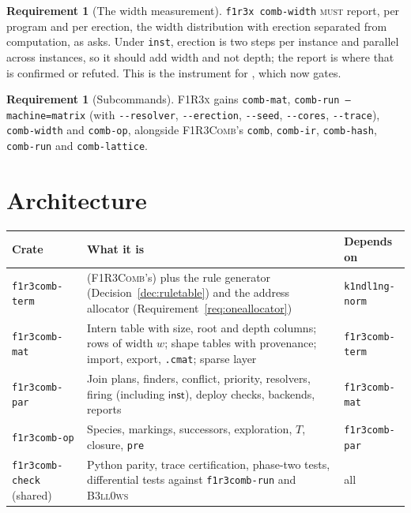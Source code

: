 \documentclass[11pt,a4paper]{article}
\newcommand{\code}[1]{\texttt{#1}}
\newcommand{\Comb}{\textsc{F1R3Comb}}
\newcommand{\Bell}{\textsc{B3ll0ws}}
\newcommand{\Fx}{\textsc{F1R3x}}
\newcommand{\MUST}{\textsc{must}}
\theoremstyle{definition}
\newtheorem{requirement}[definition]{Requirement}
\theoremstyle{plain}
\newcommand{\inst}{\mathsf{inst}}
\begin{document}
\begin{requirement}[The width measurement]\label{req:widthcmd}
\code{f1r3x comb-width} \MUST{} report, per program and per erection, the
width distribution with erection separated from computation, as
\cite[Obl.~14.6]{matnote} asks. Under \code{inst}, erection is two steps per
instance and parallel across instances, so it should add width and not depth;
the report is where that is confirmed or refuted. This is the instrument for
\cite[Obl.~13.7]{matnote}, which \cite[Obl.~14.5]{matnote} now gates.
\end{requirement}

\begin{requirement}[Subcommands]\label{req:fx}
\Fx{} gains \code{comb-mat}, \code{comb-run --machine=matrix} (with
\code{-{}-resolver}, \code{-{}-erection}, \code{-{}-seed}, \code{-{}-cores},
\code{-{}-trace}), \code{comb-width} and \code{comb-op}, alongside \Comb's
\code{comb}, \code{comb-ir}, \code{comb-hash}, \code{comb-run} and
\code{comb-lattice}.
\end{requirement}

\section{Architecture}\label{sec:arch}

\begin{center}
\begin{tabularx}{\linewidth}{@{}l>{\raggedright\arraybackslash}Xl@{}}
\toprule
Crate & What it is & Depends on\\
\midrule
\code{f1r3comb-term} & (\Comb's) plus the rule generator
(Decision~\ref{dec:ruletable}) and the address allocator
(Requirement~\ref{req:oneallocator}) & \code{k1ndl1ng-norm}\\
\code{f1r3comb-mat} & Intern table with size, root and depth columns; rows of
width $w$; shape tables with provenance; import, export, \code{.cmat}; sparse
layer & \code{f1r3comb-term}\\
\code{f1r3comb-par} & Join plans, finders, conflict, priority, resolvers,
firing (including $\inst$), deploy checks, backends, reports &
\code{f1r3comb-mat}\\
\code{f1r3comb-op} & Species, markings, successors, exploration, $T$,
closure, \code{pre} & \code{f1r3comb-par}\\
\code{f1r3comb-check} (shared) & Python parity, trace certification,
phase-two tests, differential tests against \code{f1r3comb-run} and \Bell &
all\\
\bottomrule
\end{tabularx}
\end{center}
\end{document}
